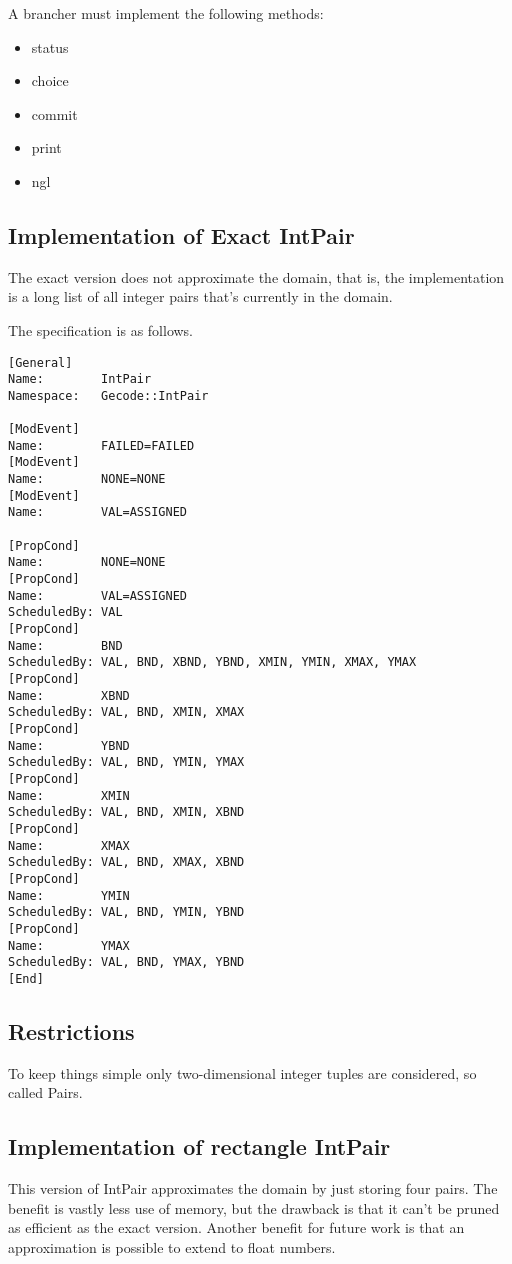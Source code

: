 \documentclass[a4paper,11pt]{article}
\begin{document}
A brancher must implement the following methods:
\begin{itemize}
\item{status}
\item{choice}
\item{commit}
\item{print}
\item{ngl}
\end{itemize}

\subsection{Implementation of Exact IntPair}
The exact version does not approximate the domain, that is, the implementation is a long list of all integer pairs that's currently in the domain.

The specification is as follows.
\begin{lstlisting}[frame=single]
[General]
Name:        IntPair
Namespace:   Gecode::IntPair

[ModEvent]
Name:        FAILED=FAILED
[ModEvent]
Name:        NONE=NONE
[ModEvent]
Name:        VAL=ASSIGNED

[PropCond]
Name:        NONE=NONE
[PropCond]
Name:        VAL=ASSIGNED
ScheduledBy: VAL
[PropCond]
Name:        BND
ScheduledBy: VAL, BND, XBND, YBND, XMIN, YMIN, XMAX, YMAX
[PropCond]
Name:        XBND
ScheduledBy: VAL, BND, XMIN, XMAX
[PropCond]
Name:        YBND
ScheduledBy: VAL, BND, YMIN, YMAX
[PropCond]
Name:        XMIN
ScheduledBy: VAL, BND, XMIN, XBND
[PropCond]
Name:        XMAX
ScheduledBy: VAL, BND, XMAX, XBND
[PropCond]
Name:        YMIN
ScheduledBy: VAL, BND, YMIN, YBND
[PropCond]
Name:        YMAX
ScheduledBy: VAL, BND, YMAX, YBND
[End]
\end{lstlisting}

\subsection{Restrictions}
To keep things simple only two-dimensional integer tuples are considered, so called Pairs.

\subsection{Implementation of rectangle IntPair}
This version of IntPair approximates the domain by just storing four pairs. The benefit is vastly less use of memory, but the drawback is that it can't be pruned as efficient as the exact version. Another benefit for future work is that an approximation is possible to extend to float numbers.
\end{document}
